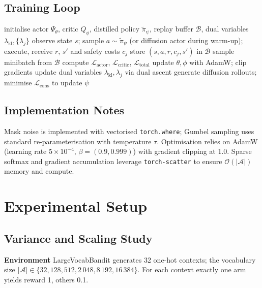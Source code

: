 \documentclass{article} %
\begin{document}
\subsection{Training Loop}
\begin{algorithm}[H]
  \caption{CatDiP-RL v2 Online Training}
  \begin{algorithmic}[1]
    \State initialise actor $\Psi_{\theta}$, critic $Q_{\phi}$, distilled policy $\tilde{\pi}_{\psi}$, replay buffer $\mathcal{B}$, dual variables $\lambda_{\text{kl}},\{\lambda_{j}\}$
      \State observe state $s$; sample $a\sim \tilde{\pi}_{\psi}$ (or diffusion actor during warm-up); execute, receive $r$, $s'$ and safety costs $c_{j}$
      \State store $(s,a,r,c_{j},s')$ in $\mathcal{B}$
        \State sample minibatch from $\mathcal{B}$
        \State compute $\mathcal{L}_{\text{actor}}$, $\mathcal{L}_{\text{critic}}$, $\mathcal{L}_{\text{total}}$
        \State update $\theta,\phi$ with AdamW; clip gradients
        \State update dual variables $\lambda_{\text{kl}},\lambda_{j}$ via dual ascent
      \EndFor
        \State generate diffusion rollouts; minimise $\mathcal{L}_{\text{cons}}$ to update $\psi$
      \EndIf
    \EndFor
  \end{algorithmic}
\end{algorithm}

\subsection{Implementation Notes}
Mask noise is implemented with vectorised \texttt{torch.where}; Gumbel sampling uses standard re-parameterisation with temperature $\tau$. Optimisation relies on AdamW (learning rate $5\times 10^{-4}$, $\beta=(0.9,0.999)$) with gradient clipping at 1.0. Sparse softmax and gradient accumulation leverage \texttt{torch-scatter} to ensure $\mathcal{O}(|\mathcal{A}|)$ memory and compute.

\section{Experimental Setup}
\label{sec:experimental}
\subsection{Variance and Scaling Study}
\textbf{Environment} LargeVocabBandit generates 32 one-hot contexts; the vocabulary size $|\mathcal{A}|\in\{32,128,512,2\,048,8\,192,16\,384\}$. For each context exactly one arm yields reward 1, others 0.1.
\end{document}
